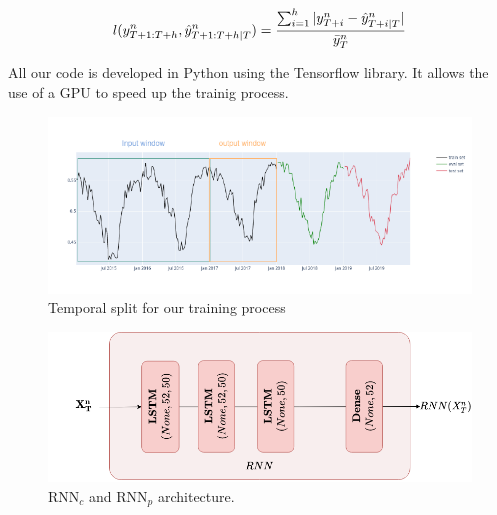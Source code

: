 \documentclass{article} %
\newcommand{\ts}{y}
\newcommand{\tspred}{\hat{\ts}}
\newcommand{\lag}{h}
\newcommand{\meants}{\Bar{\ts}}
\newcommand{\predictor}{\mathrm{RNN}_p}
\newcommand{\classifier}{\mathrm{RNN}_c}
\begin{document}
$$
l(\ts^n_{T+1:T+\lag},\tspred^n_{T+1:T+\lag|T}) = \frac{\sum_{i=1}^{\lag}|\ts^n_{T+i} - \tspred^n_{T+i|T}|}{\meants^n_T}
$$
%


All our code is developed in Python using the Tensorflow library. It allows the use of a GPU to speed up the trainig process.



\begin{figure}
  \centering
    \includegraphics[width=1.\linewidth]{figure/train_eval_test_set}
  \caption{Temporal split for our training process}
\label{fig:train_eval_test_set}
\end{figure}

\begin{figure}
  \centering
    \includegraphics[width=0.8\linewidth]{figure/lstm_archi}
  \caption{$\classifier$ and $\predictor$ architecture.}
\label{fig:rnn_architecture}
\end{figure}


\end{document}
